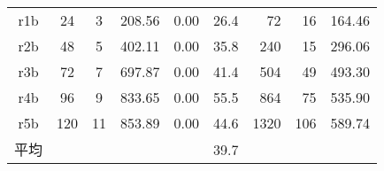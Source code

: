 \documentclass[a4j,11pt,twocolumn]{jsarticle}
\begin{document}
\begin{table*}
\begin{tabular}{cccrrrrrr}
r1b                  & 24                   & 3                    & 208.56                    & 0.00                      & 26.4                        & 72                                                                       & 16                       & 164.46                      \\
r2b                  & 48                   & 5                    & 402.11                    & 0.00                      & 35.8                        & 240                                                                      & 15                       & 296.06                      \\
r3b                  & 72                   & 7                    & 697.87                    & 0.00                      & 41.4                        & 504                                                                      & 49                       & 493.30                      \\
r4b                  & 96                   & 9                    & 833.65                    & 0.00                      & 55.5                        & 864                                                                      & 75                       & 535.90                      \\
r5b                  & 120                  & 11                   & 853.89                    & 0.00                      & 44.6                        & 1320                                                                     & 106                      & 589.74                      \\ \hline
平均                   & \multicolumn{1}{l}{} & \multicolumn{1}{l}{} &                           &                           & 39.7                        &                                                                          &                          &                             \\ \hline
\end{tabular}
\end{table*}
\end{document}
